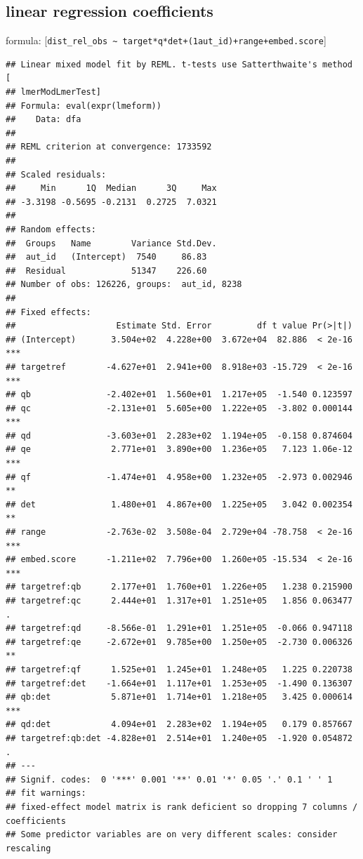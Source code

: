\documentclass[12pt,a4paper]{article}
\begin{document}
\subsection{linear regression coefficients}\label{linear-regression-coefficients}

formula: {[}\texttt{dist\_rel\_obs\ \textasciitilde{}\ target*q*det+(1\textbar{}aut\_id)+range+embed.score}{]}

\begin{verbatim}
## Linear mixed model fit by REML. t-tests use Satterthwaite's method [
## lmerModLmerTest]
## Formula: eval(expr(lmeform))
##    Data: dfa
## 
## REML criterion at convergence: 1733592
## 
## Scaled residuals: 
##     Min      1Q  Median      3Q     Max 
## -3.3198 -0.5695 -0.2131  0.2725  7.0321 
## 
## Random effects:
##  Groups   Name        Variance Std.Dev.
##  aut_id   (Intercept)  7540     86.83  
##  Residual             51347    226.60  
## Number of obs: 126226, groups:  aut_id, 8238
## 
## Fixed effects:
##                    Estimate Std. Error         df t value Pr(>|t|)    
## (Intercept)       3.504e+02  4.228e+00  3.672e+04  82.886  < 2e-16 ***
## targetref        -4.627e+01  2.941e+00  8.918e+03 -15.729  < 2e-16 ***
## qb               -2.402e+01  1.560e+01  1.217e+05  -1.540 0.123597    
## qc               -2.131e+01  5.605e+00  1.222e+05  -3.802 0.000144 ***
## qd               -3.603e+01  2.283e+02  1.194e+05  -0.158 0.874604    
## qe                2.771e+01  3.890e+00  1.236e+05   7.123 1.06e-12 ***
## qf               -1.474e+01  4.958e+00  1.232e+05  -2.973 0.002946 ** 
## det               1.480e+01  4.867e+00  1.225e+05   3.042 0.002354 ** 
## range            -2.763e-02  3.508e-04  2.729e+04 -78.758  < 2e-16 ***
## embed.score      -1.211e+02  7.796e+00  1.260e+05 -15.534  < 2e-16 ***
## targetref:qb      2.177e+01  1.760e+01  1.226e+05   1.238 0.215900    
## targetref:qc      2.444e+01  1.317e+01  1.251e+05   1.856 0.063477 .  
## targetref:qd     -8.566e-01  1.291e+01  1.251e+05  -0.066 0.947118    
## targetref:qe     -2.672e+01  9.785e+00  1.250e+05  -2.730 0.006326 ** 
## targetref:qf      1.525e+01  1.245e+01  1.248e+05   1.225 0.220738    
## targetref:det    -1.664e+01  1.117e+01  1.253e+05  -1.490 0.136307    
## qb:det            5.871e+01  1.714e+01  1.218e+05   3.425 0.000614 ***
## qd:det            4.094e+01  2.283e+02  1.194e+05   0.179 0.857667    
## targetref:qb:det -4.828e+01  2.514e+01  1.240e+05  -1.920 0.054872 .  
## ---
## Signif. codes:  0 '***' 0.001 '**' 0.01 '*' 0.05 '.' 0.1 ' ' 1
## fit warnings:
## fixed-effect model matrix is rank deficient so dropping 7 columns / coefficients
## Some predictor variables are on very different scales: consider rescaling
\end{verbatim}
\end{document}
